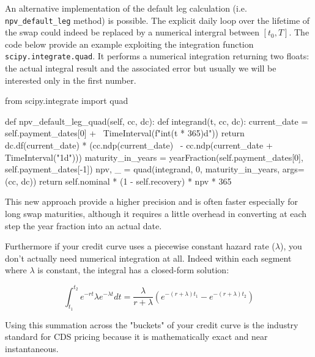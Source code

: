 \begin{finmarkets}
An alternative implementation of the default leg calculation (i.e. \texttt{npv\_default\_leg} method) is possible. The explicit daily loop over the lifetime of the swap could indeed be replaced by a numerical intergral between $[t_0, T]$.
The code below provide an example exploiting the integration function \texttt{scipy.integrate.quad}. It performs a numerical integration returning two floats: the actual integral result and the associated error but usually we will be interested only in the first number.
\begin{ipythonbox}
from scipy.integrate import quad

def npv_default_leg_quad(self, cc, dc):
  def integrand(t, cc, dc):
    current_date = self.payment_dates[0] + \ 
                   TimeInterval(f"{int(t * 365)}d"))
	return dc.df(current_date) * (cc.ndp(current_date) \
                  - cc.ndp(current_date + TimeInterval("1d")))
  maturity_in_years = yearFraction(self.payment_dates[0], 
                                   self.payment_dates[-1])
  npv, _ = quad(integrand, 0, maturity_in_years, args=(cc, dc))
  return self.nominal * (1 - self.recovery) * npv * 365
\end{ipythonbox}

This new approach provide a higher precision and is often faster especially for long swap maturities, although it requires a little overhead in converting at each step the year fraction into an actual date.

Furthermore if your credit curve uses a piecewise constant hazard rate ($\lambda$), you don't actually need numerical integration at all. Indeed within each segment where $\lambda$ is constant, the integral has a closed-form solution:

\begin{equation}
\int_{t_1}^{t_2} e^{-rt} \lambda e^{-\lambda t} dt = \frac{\lambda}{r +\lambda} \left(e^{-(r+\lambda)t_1}-e^{-(r+\lambda)t_2}\right)
\end{equation}

Using this summation across the "buckets" of your credit curve is the industry standard for CDS pricing because it is mathematically exact and near instantaneous.
\end{finmarkets}


